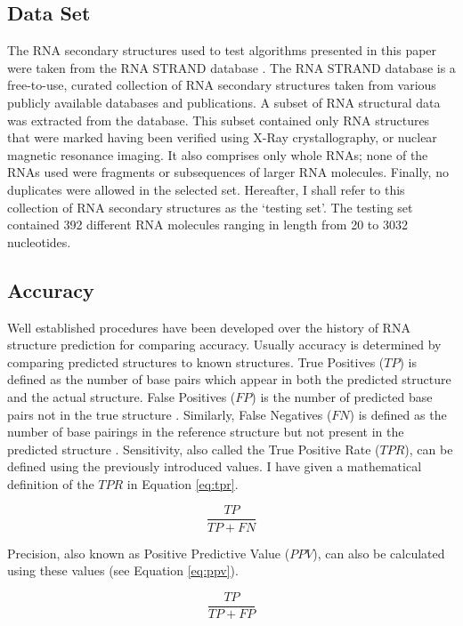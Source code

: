 \documentclass[12pt, a4paper]{article}
\begin{document}
\subsection{Data Set}
The RNA secondary structures used to test algorithms presented in this paper were taken from the RNA STRAND database \cite{andronescu2008rna}. The RNA STRAND database is a free-to-use, curated collection of RNA secondary structures taken from various publicly available databases and publications. A subset of RNA structural data was extracted from the database. This subset contained only RNA structures that were marked having been verified using X-Ray crystallography, or nuclear magnetic resonance imaging. It also comprises only whole RNAs; none of the RNAs used were fragments or subsequences of larger RNA molecules. Finally, no duplicates were allowed in the selected set. Hereafter, I shall refer to this collection of RNA secondary structures as the `testing set'. The testing set contained 392 different RNA molecules ranging in length from 20 to 3032 nucleotides.

\subsection{Accuracy}
Well established procedures have been developed over
the history of RNA structure prediction for comparing accuracy. Usually accuracy is determined by comparing predicted structures to known
structures. True Positives ($TP$) is defined as the number of base pairs which appear in both the predicted structure and the actual structure. False Positives
($FP$) is the number of predicted base pairs not in the true
structure \cite{lorenz2011viennarna}. Similarly, False Negatives ($FN$) is defined as the number of base
pairings in the reference structure but not present in the predicted structure \cite{lorenz2011viennarna}.
Sensitivity, also called the True Positive Rate ($TPR$), can be defined using the previously introduced values. I have given a mathematical definition of the $TPR$ in Equation \ref{eq:tpr}.

\begin{equation} \label{eq:tpr}
 \frac{TP}{TP + FN}
\end{equation}

Precision, also known as Positive Predictive Value ($PPV$), can also be calculated
using these values (see Equation \ref{eq:ppv}).


\begin{equation} \label{eq:ppv}
 \frac{TP}{TP + FP}
\end{equation}
\end{document}
